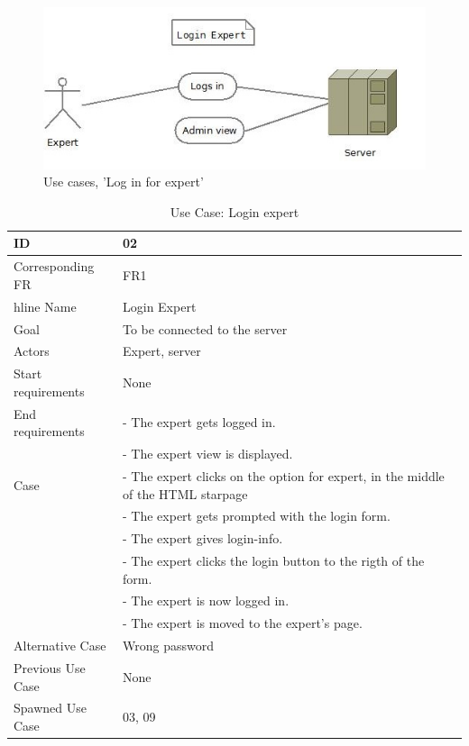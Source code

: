 \begin{figure}[H]
  \centering
    \includegraphics[width=1.0\textwidth]{img/loginexpert.jpg}
  \caption{Use cases, 'Log in for expert'} 
  \label{fig:loginexpert}
\end{figure}


\begin{table}[H]
\begin{tabular}{|l|p{14cm}|} \hline
	\textbf{ID} & \textbf{02}\\ \hline
	Corresponding FR & FR1\\hline
	Name & Login Expert\\ \hline
	Goal & To be connected to the server\\ \hline
	Actors & Expert, server\\ \hline
	Start requirements & None\\ \hline
	End requirements & - The expert gets logged in.\\
					 & - The expert view is displayed.\\ \hline
	Case & - The expert clicks on the option for expert, in the middle of the HTML starpage\\
			& - The expert gets prompted with the login form. \\
		 	& - The expert gives login-info.\\
			& - The expert clicks the login button to the rigth of the form.\\
			& - The expert is now logged in.\\ 
			& - The expert is moved to the expert's page. \\ \hline
	Alternative Case & Wrong password\\ \hline
	Previous Use Case & None\\ \hline
	Spawned Use Case & 03, 09\\ \hline
\end{tabular}
\caption{Use Case: Login expert}
\label{fig:usecase02table}
\end{table}


